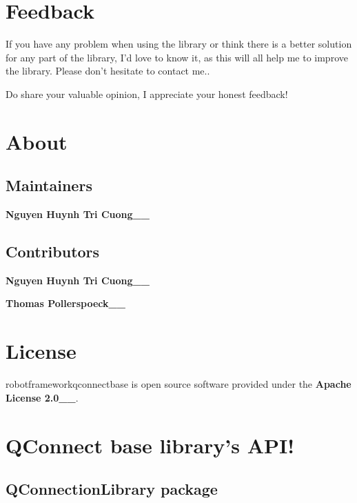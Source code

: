 \documentclass[letterpaper,10pt,english]{sphinxmanual}
\begin{document}
\chapter{Feedback}
\label{\detokenize{index:feedback}}
\sphinxAtStartPar
If you have any problem when using the library or think there is a
better solution for any part of the library, I’d love to know it, as
this will all help me to improve the library. Please don’t hesitate
to contact me..

\sphinxAtStartPar
Do share your valuable opinion, I appreciate your honest feedback!


\chapter{About}
\label{\detokenize{index:about}}

\section{Maintainers}
\label{\detokenize{index:maintainers}}
\sphinxAtStartPar
{\color{red}\bfseries{}\textasciigrave{}Nguyen Huynh Tri Cuong\textasciigrave{}\_\_}


\section{Contributors}
\label{\detokenize{index:contributors}}
\sphinxAtStartPar
{\color{red}\bfseries{}\textasciigrave{}Nguyen Huynh Tri Cuong\textasciigrave{}\_\_}

\sphinxAtStartPar
{\color{red}\bfseries{}\textasciigrave{}Thomas Pollerspoeck\textasciigrave{}\_\_}


\chapter{License}
\label{\detokenize{index:license}}
\sphinxAtStartPar
robotframework\sphinxhyphen{}qconnect\sphinxhyphen{}base is open source software provided under the {\color{red}\bfseries{}\textasciigrave{}Apache License
2.0\textasciigrave{}\_\_}.


\chapter{QConnect base library’s API!}
\label{\detokenize{index:qconnect-base-library-s-api}}

\section{QConnectionLibrary package}
\label{\detokenize{QConnectionLibrary:qconnectionlibrary-package}}\label{\detokenize{QConnectionLibrary::doc}}
\end{document}
